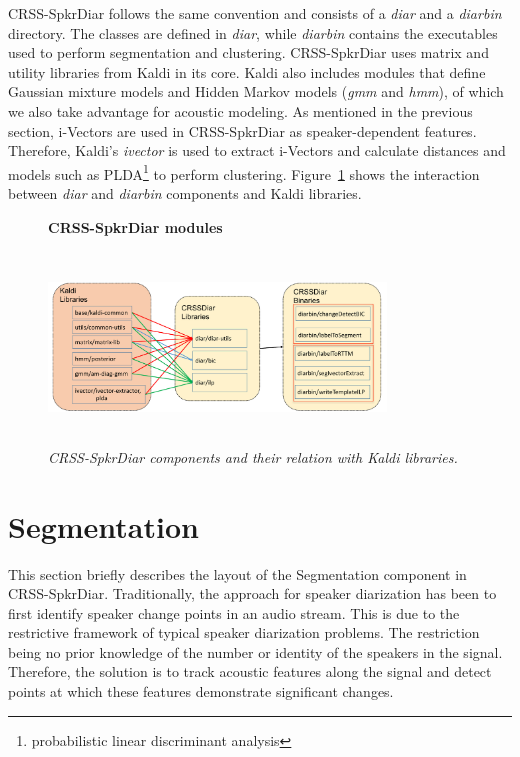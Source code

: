 CRSS-SpkrDiar follows the same convention and consists of a {\it diar} and a {\it diarbin} directory. 
The classes are defined in {\it diar}, while {\it diarbin} contains the executables used to perform segmentation and clustering. 
CRSS-SpkrDiar uses matrix and utility libraries from Kaldi in its core.  
Kaldi also includes modules that define Gaussian mixture models and Hidden Markov models ({\it gmm} and {\it hmm}), of which we also take advantage for acoustic modeling. 
As mentioned in the previous section, i-Vectors are used in CRSS-SpkrDiar as speaker-dependent features. 
Therefore, Kaldi's {\it ivector} is used to extract i-Vectors and calculate distances and models such as PLDA\footnote{probabilistic linear discriminant analysis} to perform clustering. 
Figure~\ref{fig:crssdiar_vs_kaldi} shows the interaction between {\it diar} and {\it diarbin} components and Kaldi libraries. 

\begin{figure}[t!]
	\centering
	\textbf{CRSS-SpkrDiar modules}\par\medskip
	\includegraphics[height = 2in, width=0.8\textwidth]{figures/crssdiar_and_kaldi}
	\caption{\it \small CRSS-SpkrDiar components and their relation with Kaldi libraries.  }
	\label{fig:crssdiar_vs_kaldi}
	\vspace{-3mm}
\end{figure}

\section{Segmentation}
\label{sec:segmentation}
This section briefly describes the layout of the Segmentation component in CRSS-SpkrDiar. 
Traditionally, the approach for speaker diarization has been to first identify speaker change points in an audio stream. 
This is due to the restrictive framework of typical speaker diarization problems. 
The restriction being no prior knowledge of the number or identity of the speakers in the signal. 
Therefore, the solution is to track acoustic features along the signal and detect points at which these features demonstrate significant changes. 

